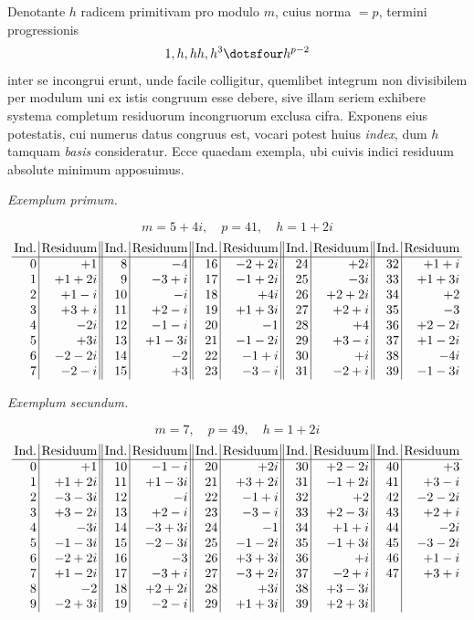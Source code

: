 Denotante $h$ radicem primitivam pro modulo $m$, cuius norma $=p$, termini progressionis
\[
1,h,hh,h^3\dotsfour h^{p-2}
\]
inter se incongrui erunt, unde facile colligitur, quemlibet integrum non divisibilem per modulum uni ex istis congruum esse debere, sive illam seriem exhibere systema completum residuorum incongruorum exclusa cifra. Exponens eius potestatis, cui numerus datus congruus est, vocari potest huius \emph{index}, dum $h$ tamquam \emph{basis} consideratur. Ecce quaedam exempla, ubi cuivis indici residuum absolute minimum apposuimus.

\begin{center}\emph{Exemplum primum.}\end{center}
\[
m=5+4i,\quad p=41,\quad h=1+2i
\]
\begingroup\small
\[
\setlength{\arraycolsep}{2pt}
\begin{array}{r|r||r|r||r|r||r|r||r|r}
\text{Ind.}&\text{Residuum}&\text{Ind.}&\text{Residuum}&\text{Ind.}&\text{Residuum}&\text{Ind.}&\text{Residuum}&\text{Ind.}&\text{Residuum}\\\hline
0&+1&8&-4&16&-2+2i&24&+2i&32&+1+i\\
1&+1+2i&9&-3+i&17&-1+2i&25&-3i&33&+1+3i\\
2&+1-i&10&-i&18&+4i&26&+2+2i&34&+2\\
3&+3+i&11&+2-i&19&+1+3i&27&+2+i&35&-3\\
4&-2i&12&-1-i&20&-1&28&+4&36&+2-2i\\
5&+3i&13&+1-3i&21&-1-2i&29&+3-i&37&+1-2i\\
6&-2-2i&14&-2&22&-1+i&30&+i&38&-4i\\
7&-2-i&15&+3&23&-3-i&31&-2+i&39&-1-3i
\end{array}
\]
\endgroup

%
\begin{center}\emph{Exemplum secundum.}\end{center}
\[
m=7,\quad p=49,\quad h=1+2i
\]
\begingroup\small
\[
\setlength{\arraycolsep}{2pt}
\begin{array}{r|r||r|r||r|r||r|r||r|r}
\text{Ind.}&\text{Residuum}&\text{Ind.}&\text{Residuum}&\text{Ind.}&\text{Residuum}&\text{Ind.}&\text{Residuum}&\text{Ind.}&\text{Residuum}\\\hline
0&+1&10&-1-i&20&+2i&30&+2-2i&40&+3\\
1&+1+2i&11&+1-3i&21&+3+2i&31&-1+2i&41&+3-i\\
2&-3-3i&12&-i&22&-1+i&32&+2&42&-2-2i\\
3&+3-2i&13&+2-i&23&-3-i&33&+2-3i&43&+2+i\\
4&-3i&14&-3+3i&24&-1&34&+1+i&44&-2i\\
5&-1-3i&15&-2-3i&25&-1-2i&35&-1+3i&45&-3-2i\\
6&-2+2i&16&-3&26&+3+3i&36&+i&46&+1-i\\
7&+1-2i&17&-3+i&27&-3+2i&37&-2+i&47&+3+i\\
8&-2&18&+2+2i&28&+3i&38&+3-3i&&\\
9&-2+3i&19&-2-i&29&+1+3i&39&+2+3i&&
\end{array}
\]
\endgroup

